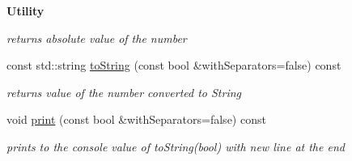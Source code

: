 \begin{Indent}{\bf Utility}
\begin{DoxyCompactItemize}
\begin{DoxyCompactList}\small\item\em returns absolute value of the number \end{DoxyCompactList}\item 
const std\-::string \hyperlink{classcjr_1_1number_a4eb89bde4b4866e761170d6c47dd46ab}{to\-String} (const bool \&with\-Separators=false) const 
\begin{DoxyCompactList}\small\item\em returns value of the number converted to String \end{DoxyCompactList}\item 
void \hyperlink{classcjr_1_1number_aab0fd6f29b9b3ab88fbead6aa7d4dba8}{print} (const bool \&with\-Separators=false) const 
\begin{DoxyCompactList}\small\item\em prints to the console value of to\-String(bool) with new line at the end \end{DoxyCompactList}\end{DoxyCompactItemize}
\end{Indent}
